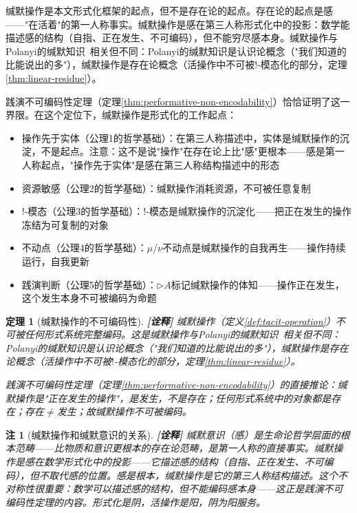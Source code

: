 \documentclass[11pt,a4paper]{article}
\newtheorem{theorem}{定理}
\newtheorem{remark}{注}
\newcommand{\lvl}[1]{\hfill\textbf{\footnotesize[#1]}}
\newcommand{\lvI}{\lvl{诠释}}
\newcommand{\bang}{{!}}
\begin{document}
缄默操作是本文形式化框架的起点，但不是存在论的起点。存在论的起点是感——"在活着"的第一人称事实。缄默操作是感在第三人称形式化中的投影：数学能描述感的结构（自指、正在发生、不可编码），但不能穷尽感本身。缄默操作与Polanyi的缄默知识~\cite{polanyi66}相关但不同：Polanyi的缄默知识是认识论概念（"我们知道的比能说出的多"），缄默操作是存在论概念（活操作中不可被$\bang$-模态化的部分，定理\ref{thm:linear-residue}）。

践演不可编码性定理（定理\ref{thm:performative-non-encodability}）恰恰证明了这一界限。在这个定位下，缄默操作是形式化的工作起点：
\begin{itemize}
  \item 操作先于实体（公理1的哲学基础）：在第三人称描述中，实体是缄默操作的沉淀，不是起点。注意：这不是说"操作"在存在论上比"感"更根本——感是第一人称起点，"操作先于实体"是感在第三人称结构描述中的形态
  \item 资源敏感（公理2的哲学基础）：缄默操作消耗资源，不可被任意复制
  \item !-模态（公理3的哲学基础）：!-模态是缄默操作的沉淀化——把正在发生的操作冻结为可复制的对象
  \item 不动点（公理4的哲学基础）：$\mu$/$\nu$不动点是缄默操作的自我再生——操作持续运行，自我更新
  \item 践演判断（公理5的哲学基础）：$\triangleright A$标记缄默操作的体知——操作正在发生，这个发生本身不可被编码为命题
\end{itemize}

\begin{theorem}[缄默操作的不可编码性]\label{thm:tacit-non-encodability}\lvI
缄默操作（定义\ref{def:tacit-operation}）不可被任何形式系统完整编码。这是缄默操作与Polanyi的缄默知识~\cite{polanyi66}相关但不同：Polanyi的缄默知识是认识论概念（"我们知道的比能说出的多"），缄默操作是存在论概念（活操作中不可被$\bang$-模态化的部分，定理\ref{thm:linear-residue}）。

践演不可编码性定理（定理\ref{thm:performative-non-encodability}）的直接推论：缄默操作是"正在发生的操作"，是发生，不是存在；任何形式系统中的对象都是存在；存在$\neq$发生；故缄默操作不可被编码。
\end{theorem}

\begin{remark}[缄默操作和缄默意识的关系]\lvI
缄默意识（感）是生命论哲学层面的根本范畴——比物质和意识更根本的存在论范畴，是第一人称的直接事实。缄默操作是感在数学形式化中的投影——它描述感的结构（自指、正在发生、不可编码），但不取代感的位置。感是根本，缄默操作是它的第三人称结构描述。这个不对称性很重要：数学可以描述感的结构，但不能编码感本身——这正是践演不可编码性定理的内容。形式化是阴，活操作是阳，阴为阳服务。
\end{remark}
\end{document}
